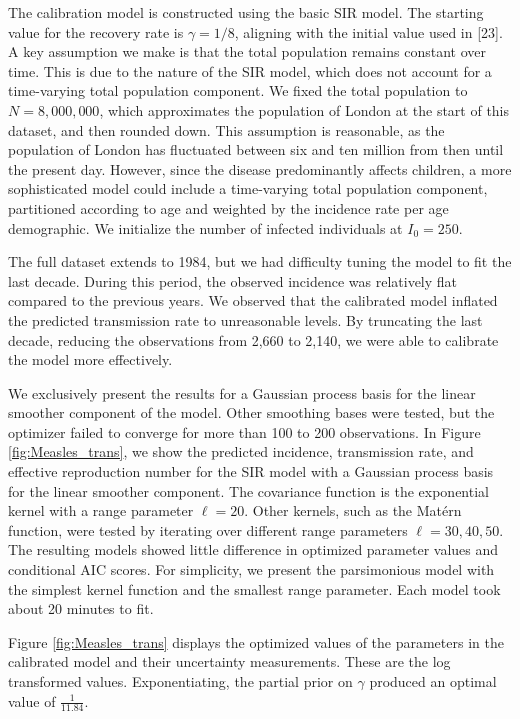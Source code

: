\documentclass[
11pt, %
oneside, %
english, %
singlespacing, %
]{macthesis} %
\begin{document}
The calibration model is constructed using the basic SIR model. The starting value for the recovery rate is \(\gamma = 1/8\), aligning with the initial value used in {[}23{]}. A key assumption we make is that the total population remains constant over time. This is due to the nature of the SIR model, which does not account for a time-varying total population component. We fixed the total population to \(N = 8,000,000\), which approximates the population of London at the start of this dataset, and then rounded down. This assumption is reasonable, as the population of London has fluctuated between six and ten million from then until the present day. However, since the disease predominantly affects children, a more sophisticated model could include a time-varying total population component, partitioned according to age and weighted by the incidence rate per age demographic. We initialize the number of infected individuals at \(I_0 = 250\).

The full dataset extends to 1984, but we had difficulty tuning the model to fit the last decade. During this period, the observed incidence was relatively flat compared to the previous years. We observed that the calibrated model inflated the predicted transmission rate to unreasonable levels. By truncating the last decade, reducing the observations from 2,660 to 2,140, we were able to calibrate the model more effectively.

We exclusively present the results for a Gaussian process basis for the linear smoother component of the model. Other smoothing bases were tested, but the optimizer failed to converge for more than 100 to 200 observations. In Figure \ref{fig:Measles_trans}, we show the predicted incidence, transmission rate, and effective reproduction number for the SIR model with a Gaussian process basis for the linear smoother component. The covariance function is the exponential kernel with a range parameter \(\ell = 20\). Other kernels, such as the Matérn function, were tested by iterating over different range parameters \(\ell = 30, 40, 50\). The resulting models showed little difference in optimized parameter values and conditional AIC scores. For simplicity, we present the parsimonious model with the simplest kernel function and the smallest range parameter. Each model took about 20 minutes to fit.

Figure \ref{fig:Measles_trans} displays the optimized values of the parameters in the calibrated model and their uncertainty measurements. These are the log transformed values. Exponentiating, the partial prior on \(\gamma\) produced an optimal value of \(\frac{1}{11.84}\).
\end{document}
